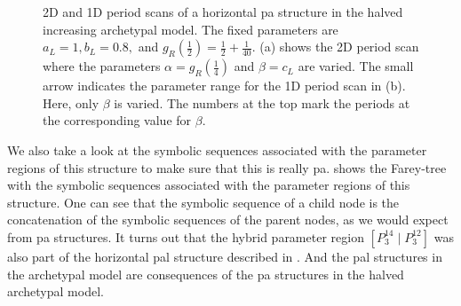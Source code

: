 \begin{figure}
	\centering
	\caption[2D and 1D period scans of a horizontal period-adding structure in the halved increasing archetypal model]{
		2D and 1D period scans of a horizontal \gls{pa} structure in the halved increasing archetypal model.
		The fixed parameters are $a_L = 1, b_L = 0.8,$ and $g_R\left(\frac{1}{2}\right) = \frac{1}{2} + \frac{1}{40}$.
		(a) shows the 2D period scan where the parameters $\alpha = g_R\left(\frac{1}{4}\right)$ and $\beta = c_L$ are varied.
		The small arrow indicates the parameter range for the 1D period scan in (b).
		Here, only $\beta$ is varied.
		The numbers at the top mark the periods at the corresponding value for $\beta$.
	}
	\label{fig:add.halved.hor}
\end{figure}

We also take a look at the symbolic sequences associated with the parameter regions of this structure to make sure that this is really \gls{pa}.
 shows the Farey-tree with the symbolic sequences associated with the parameter regions of this structure.
One can see that the symbolic sequence of a child node is the concatenation of the symbolic sequences of the parent nodes, as we would expect from \gls{pa} structures.
It turns out that the hybrid parameter region $\left[P^{14}_3 \mid P^{12}_3\right]$ was also part of the horizontal \gls{pal} structure described in .
And the \gls{pal} structures in the archetypal model are consequences of the \gls{pa} structures in the halved archetypal model.


